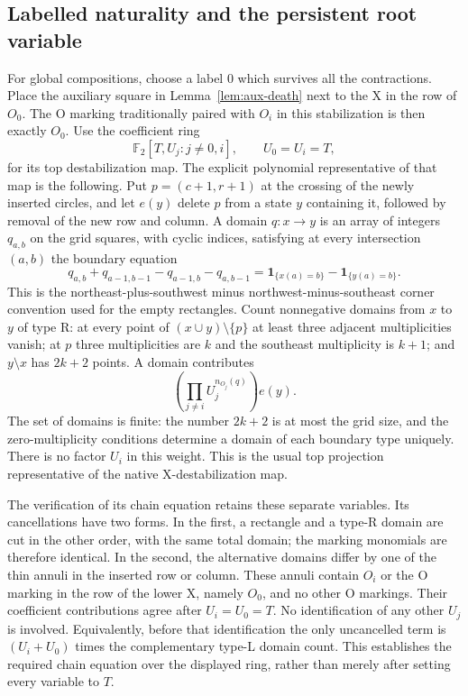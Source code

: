 \documentclass[11pt,a4paper]{article}
\theoremstyle{remark}
\begin{document}
\subsection{Labelled naturality and the persistent root variable}

For global compositions, choose a label $0$ which survives all the
contractions.  Place the auxiliary square in Lemma~\ref{lem:aux-death}
next to the X in the row of $O_0$.  The O marking traditionally paired
with $O_i$ in this stabilization is then exactly $O_0$.
Use the coefficient ring
\[
 \mathbb F_2[T,U_j:j\ne0,i],\qquad U_0=U_i=T,
\]
for its top destabilization map.  The explicit polynomial representative
of that map is the following.  Put $p=(c+1,r+1)$ at the crossing of
the newly inserted circles, and let $e(y)$ delete $p$ from a state
$y$ containing it, followed by removal of the new row and column.
A domain $q:x\to y$ is an array of integers $q_{a,b}$ on the
grid squares, with cyclic indices, satisfying at every intersection
$(a,b)$ the boundary equation
\[
 q_{a,b}+q_{a-1,b-1}-q_{a-1,b}-q_{a,b-1}
   =\mathbf 1_{\{x(a)=b\}}-\mathbf 1_{\{y(a)=b\}}.
\]
This is the northeast-plus-southwest minus northwest-minus-southeast
corner convention used for the empty rectangles.  Count nonnegative
domains from $x$ to $y$ of type R: at every point of
$(x\cup y)\setminus\{p\}$ at least three adjacent multiplicities
vanish; at $p$ three
multiplicities are $k$ and the southeast multiplicity is $k+1$; and
$y\setminus x$ has $2k+2$ points.  A domain contributes
\[
 \left(\prod_{j\ne i}U_j^{n_{O_j}(q)}\right)e(y).
\]
The set of domains is finite: the number $2k+2$ is at most the grid size,
and the zero-multiplicity conditions determine a domain of each boundary
type uniquely.  There is no factor $U_i$ in this weight.  This is the
usual top projection representative of the native X-destabilization map.

The verification of its chain equation retains these separate
variables.  Its cancellations have two forms.  In the first, a rectangle
and a type-R domain are cut in the other order, with the same total
domain; the marking monomials are therefore identical.  In the second,
the alternative domains differ by one of the thin annuli in the inserted
row or column.  These annuli contain $O_i$ or the O marking in the row
of the lower X, namely $O_0$, and no other O markings.  Their coefficient
contributions agree after $U_i=U_0=T$.  No identification of any other
$U_j$ is involved.  Equivalently, before that identification the only
uncancelled term is $(U_i+U_0)$ times the complementary type-L domain
count.  This establishes the required chain equation over the displayed
ring, rather than merely after setting every variable to $T$.
\end{document}
